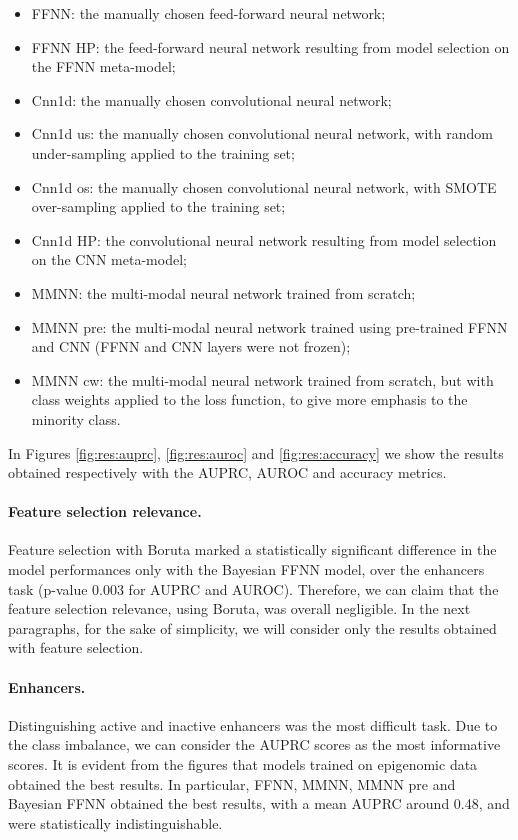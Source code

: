 \documentclass{article}
\begin{document}
\begin{itemize}
    \item FFNN: the manually chosen feed-forward neural network;
    \item FFNN HP: the feed-forward neural network resulting from model selection on the FFNN meta-model;
    \item Cnn1d: the manually chosen convolutional neural network;
    \item Cnn1d us: the manually chosen convolutional neural network, with random under-sampling applied to the training set;
    \item Cnn1d os: the manually chosen convolutional neural network, with SMOTE over-sampling applied to the training set;
    \item Cnn1d HP: the convolutional neural network resulting from model selection on the CNN meta-model;
    \item MMNN: the multi-modal neural network trained from scratch;
    \item MMNN pre: the multi-modal neural network trained using pre-trained FFNN and CNN (FFNN and CNN layers were not frozen);
    \item MMNN cw: the multi-modal neural network trained from scratch, but with class weights applied to the loss function, to give more emphasis to the minority class.
\end{itemize}

In Figures \ref{fig:res:auprc}, \ref{fig:res:auroc} and \ref{fig:res:accuracy} we show the results obtained respectively with the AUPRC, AUROC and accuracy metrics.  

\paragraph{Feature selection relevance.} Feature selection with Boruta marked a statistically significant difference in the model performances only with the Bayesian FFNN model, over the enhancers task (p-value 0.003 for AUPRC and AUROC). Therefore, we can claim that the feature selection relevance, using Boruta, was overall negligible. In the next paragraphs, for the sake of simplicity, we will consider only the results obtained with feature selection.

\paragraph{Enhancers.} Distinguishing active and inactive enhancers was the most difficult task. Due to the class imbalance, we can consider the AUPRC scores as the most informative scores. It is evident from the figures that models trained on epigenomic data obtained the best results. In particular, FFNN, MMNN, MMNN pre and Bayesian FFNN obtained the best results, with a mean AUPRC around 0.48, and were statistically indistinguishable.
\end{document}
